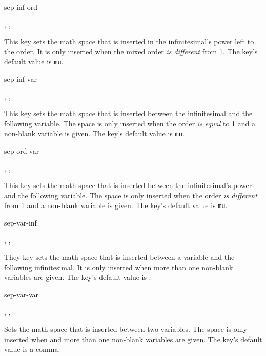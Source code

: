 \begin{option}{sep-inf-ord}
	\begin{values}[default = 0]
		, , 
	\end{values}
	This key sets the math space that is inserted in the infinitesimal's power left to the order. It is only inserted when the mixed order \emph{is different} from \num{1}. The key's default value is  \texttt{mu}.
\end{option}

\begin{option}{sep-inf-var}
	\begin{values}[default = 0]
		, , 
	\end{values}
	This key sets the math space that is inserted between the infinitesimal and the following variable. The space is only inserted when the order \emph{is equal} to \num{1} and a non-blank variable is given. The key's default value is  \texttt{mu}.
\end{option}

\begin{option}{sep-ord-var}
	\begin{values}[default = 0]
		, , 
	\end{values}
	This key sets the math space that is inserted between the infinitesimal's power and the following variable. The space is only inserted when the order \emph{is different} from \num{1} and a non-blank variable is given. The key's default value is  \texttt{mu}.
\end{option}

\begin{option}{sep-var-inf}
	\begin{values}[default = \cs{mathop}\{\}\cs{!}]
		, , 
	\end{values}
	They key sets the math space that is inserted between a variable and the following infinitesimal. It is only inserted when more than one non-blank variables are given. The key's default value is .
\end{option}

\begin{option}{sep-var-var}
	\begin{values}[default = {{,}}]
		, , 
	\end{values}
	Sets the math space that is inserted between two variables. The space is only inserted when  and more than one non-blank variables are given. The key's default value is a comma.
\end{option}

